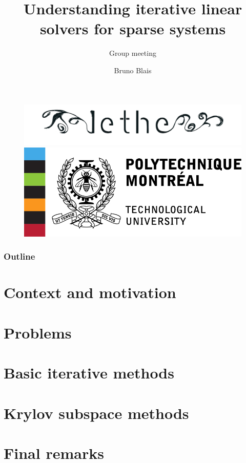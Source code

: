 \documentclass[t, 9pt,xcolor=dvipsnames]{beamer}
\title{\textbf{Understanding iterative linear solvers for sparse systems}}
\subtitle{Group meeting}
\author{Bruno Blais}
\begin{document}
	\begin{frame}
	\vspace{0.5cm}
		\begin{figure}
	  		\includegraphics[scale = 0.12]{images/logo_lethe.png}\hspace*{0.2cm}
	  		\includegraphics[scale = 0.4]{images/logo-poly.jpg}
		\end{figure}
		\titlepage
	\end{frame}
	
	\begin{frame}
		\frametitle{\textbf{Outline}}
		\tableofcontents
	\end{frame}
	
	\section{Context and motivation}
	
	
	\section{Problems}
	
	
	\section{Basic iterative methods}
	
	
	\section{Krylov subspace methods}
	
    	

    
	\section{Final remarks}
    
	
	\nocite{*} %
	    

    \appendix
\end{document}
